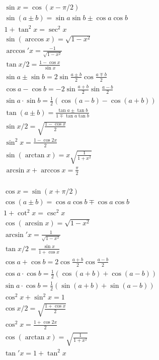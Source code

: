 \begin{minipage}{0.55\textwidth}
\begin{equation}
\begin{split}
    & \sin{x} = \cos{(x-\pi/2)}\\
    & \sin{(a\pm b)} = \sin{a}\sin{b}\pm\cos{a}\cos{b}\\
    & 1+\tan^2{x} = \sec^2{x}\\
    & \sin{(\arccos{x})} = \sqrt{1-x^2}\\
    & \arccos'{x} = \frac{-1}{\sqrt{1-x^2}}\\
    & \tan{x/2} = \frac{1-\cos{x}}{\sin{x}}\\
    & \sin{a}\pm\sin{b} = 2\sin{\frac{a\pm b}{2}}\cos{\frac{a\mp b}{2}}\\
    & \cos{a}-\cos{b} = -2\sin{\frac{a+b}{2}}\sin{\frac{a-b}{2}}\\
    & \sin{a}\cdot\sin{b} = \frac{1}{2}(\cos{(a-b)}-\cos{(a+b)})\\
    & \tan{(a\pm b)}=\frac{\tan{a}\pm\tan{b}}{1\mp \tan{a}\tan{b}}\\
    & \sin{x/2}=\sqrt{\frac{1-\cos{x}}{2}}\\
    & \sin^2{x}=\frac{1-\cos{2x}}{2}\\
    & \sin{(\arctan{x})} = x\sqrt{\frac{1}{1+x^2}}\\
    &\arcsin{x}+\arccos{x}=\frac{\pi}{2}\\
\end{split}
\nonumber
\end{equation}
\end{minipage}
\begin{minipage}{0.55\textwidth}
\begin{equation}
\begin{split}
    & \cos{x} = \sin{(x+\pi/2)}\\
    & \cos{(a\pm b)} = \cos{a}\cos{b}\mp\cos{a}\cos{b}\\
    & 1+\cot^2{x} = \csc^2{x}\\
    & \cos{(\arcsin{x})} = \sqrt{1-x^2}\\
    & \arcsin'{x} = \frac{1}{\sqrt{1-x^2}}\\
    & \tan{x/2} = \frac{\sin{x}}{1+\cos{x}}\\
    & \cos{a}+\cos{b} = 2\cos{\frac{a+b}{2}}\cos{\frac{a-b}{2}}\\
    & \cos{a}\cdot\cos{b} = \frac{1}{2}(\cos{(a+b)}+\cos{(a-b)})\\
    & \sin{a}\cdot\cos{b} = \frac{1}{2}(\sin{(a+b)}+\sin{(a-b)})\\
    & \cos^2{x}+\sin^2{x} = 1\\
    & \cos{x/2}=\sqrt{\frac{1+\cos{x}}{2}}\\
    & \cos^2{x}=\frac{1+\cos{2x}}{2}\\
    & \cos{(\arctan{x})} = \sqrt{\frac{1}{1+x^2}}\\
    & \tan'{x}=1+\tan^2{x}
\end{split}
\nonumber
\end{equation}
\end{minipage}

